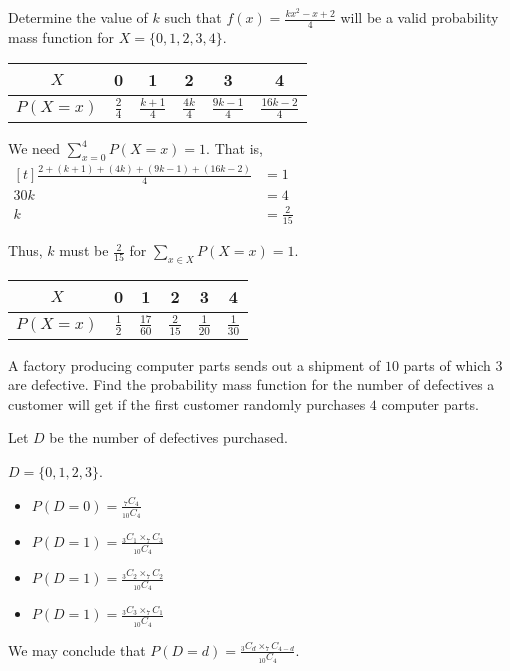 \begin{example}
    Determine the value of $k$ such that $f(x) = \frac{kx^2 - x + 2}{4}$ will be a valid probability mass function for $X = \{ 0, 1, 2, 3, 4 \}$.

    \begin{center}
        \begin{tabular}{c | c c c c c}
            $X$        & 0             & 1               & 2              & 3                & 4                 \\
            \hline
            $P(X = x)$ & $\frac{2}{4}$ & $\frac{k+1}{4}$ & $\frac{4k}{4}$ & $\frac{9k-1}{4}$ & $\frac{16k-2}{4}$
        \end{tabular}
    \end{center}

    We need $\sum_{x=0}^4 P(X = x) = 1$. That is, 
    $\begin{aligned}[t]
        \frac{2 + (k+1) + (4k) + (9k-1) + (16k-2)}{4} & = 1            \\
        30k                                           & = 4            \\
        k                                             & = \frac{2}{15}
    \end{aligned}$

    Thus, $k$ must be $\frac{2}{15}$ for $\sum_{x \in X} P(X = x) = 1$. 

    \begin{center}
        \begin{tabular}{c | c c c c c}
            $X$        & 0             & 1               & 2              & 3              & 4              \\
            \hline
            $P(X = x)$ & $\frac{1}{2}$ & $\frac{17}{60}$ & $\frac{2}{15}$ & $\frac{1}{20}$ & $\frac{1}{30}$
        \end{tabular}
    \end{center}
\end{example}

\begin{example}
    A factory producing computer parts sends out a shipment of $10$ parts of which $3$ are defective. Find the probability mass function for the number of defectives a customer will get if the first customer randomly purchases $4$ computer parts.

    Let $D$ be the number of defectives purchased. 

    $D = \{ 0, 1, 2, 3 \}$. 

    \begin{itemize}
        \item $P(D = 0) = \frac{_7C_4}{_{10}C_4}$
        \item $P(D = 1) = \frac{_3C_1 \times _7C_3}{_{10}C_4}$
        \item $P(D = 1) = \frac{_3C_2 \times _7C_2}{_{10}C_4}$
        \item $P(D = 1) = \frac{_3C_3 \times _7C_1}{_{10}C_4}$
    \end{itemize}

    We may conclude that $P(D = d) = \frac{_3C_d \times _7C_{4-d}}{_{10}C_4}$. 
\end{example}

